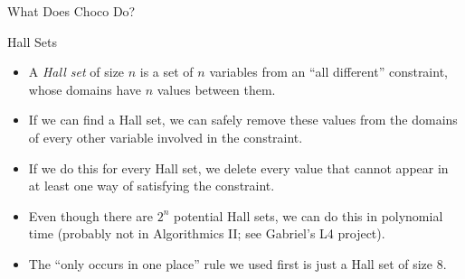 \documentclass{beamer}
\begin{document}
\begin{frame}[fragile]{What Does Choco Do?}
     {
        
    }

     {
        

        \begin{center}\end{center}
    }

     {
        
    }

     {
        
    }
\end{frame}

\begin{frame}{Hall Sets}
    \begin{itemize}
        \item A \emph{Hall set} of size $n$ is a set of $n$ variables from an ``all different''
            constraint, whose domains have $n$ values between them.

        \item If we can find a Hall set, we can safely remove these values from the domains of every
            other variable involved in the constraint.

        \item If we do this for every Hall set, we delete every value that cannot appear in at least
            one way of satisfying the constraint.

        \item Even though there are $2^n$ potential Hall sets, we can do this in polynomial time
            (probably not in Algorithmics II; see Gabriel's L4 project).

        \item The ``only occurs in one place'' rule we used first is just a Hall set of size 8.
    \end{itemize}
\end{frame}
\end{document}
